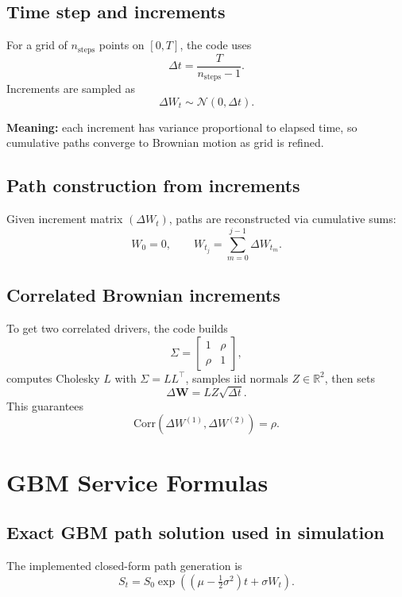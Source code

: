 \documentclass[11pt]{article}
\begin{document}
\subsection{Time step and increments}
For a grid of $n_{\text{steps}}$ points on $[0,T]$, the code uses
\begin{equation}
\Delta t = \frac{T}{n_{\text{steps}}-1}.
\end{equation}
Increments are sampled as
\begin{equation}
\Delta W_t \sim \mathcal{N}(0,\Delta t).
\end{equation}

\textbf{Meaning:} each increment has variance proportional to elapsed time, so cumulative paths converge to Brownian motion as grid is refined.

\subsection{Path construction from increments}
Given increment matrix $(\Delta W_t)$, paths are reconstructed via cumulative sums:
\begin{equation}
W_0 = 0, \qquad W_{t_j} = \sum_{m=0}^{j-1} \Delta W_{t_m}.
\end{equation}

\subsection{Correlated Brownian increments}
To get two correlated drivers, the code builds
\begin{equation}
\Sigma =
\begin{bmatrix}
1 & \rho\\
\rho & 1
\end{bmatrix},
\end{equation}
computes Cholesky $L$ with $\Sigma = LL^\top$, samples iid normals $Z\in\mathbb{R}^2$, then sets
\begin{equation}
\Delta \bm{W} = L Z \sqrt{\Delta t}.
\end{equation}
This guarantees
\begin{equation}
\mathrm{Corr}(\Delta W^{(1)},\Delta W^{(2)}) = \rho.
\end{equation}

\section{GBM Service Formulas}

\subsection{Exact GBM path solution used in simulation}
The implemented closed-form path generation is
\begin{equation}
S_t = S_0\exp\!\left((\mu-\tfrac12\sigma^2)t + \sigma W_t\right).
\end{equation}
\end{document}
